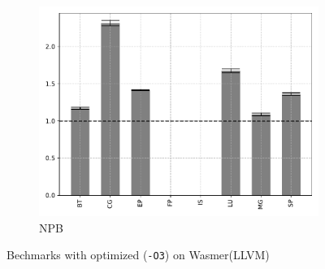 \begin{figure}
\begin{subfigure}[t]{.45\textwidth}
        \includegraphics[width=\textwidth]
        {Images/6.1.RQ1/npb-wasmer-llvm-opt.pdf}
        \caption{NPB}
    \end{subfigure}
    \caption{Bechmarks with optimized (\texttt{-O3}) on Wasmer(LLVM)}
\end{figure}

